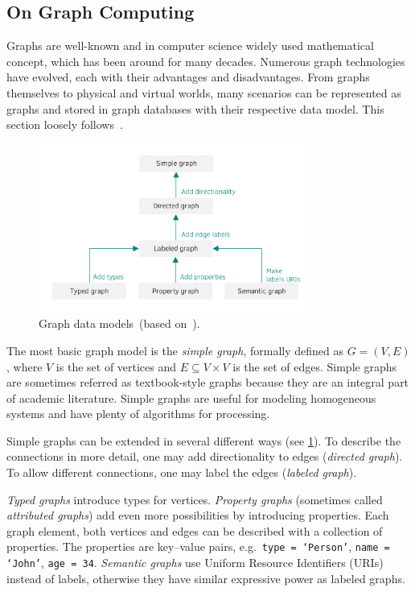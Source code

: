 \subsection{On Graph Computing}
Graphs are well-known and in computer science widely used mathematical concept, which has been around for many decades. Numerous graph technologies have evolved, each with their advantages and disadvantages. From graphs themselves to physical and virtual worlds, many scenarios can be represented as graphs and stored in graph databases with their respective data model. This section loosely follows~\cite{scm, On_Graph_Computing}.

\begin{figure}[!ht]
	\centering
	\includegraphics[width=0.8\textwidth]{include/figures/graph-classes}
	\caption{Graph data models~(based on~\cite{DBLP:journals/corr/abs-1006-2361}).}
	\label{fig:graph-classes}
\end{figure}

The most basic graph model is the \emph{simple graph}, formally defined as $G = (V, E)$, where $V$ is the set of vertices and $E \subseteq V \times V$ is the set of edges. Simple graphs are sometimes referred as textbook-style graphs because they are an integral part of academic literature. Simple graphs are useful for modeling homogeneous systems and have plenty of algorithms for processing.

Simple graphs can be extended in several different ways (see \cref{fig:graph-classes}). To describe the connections in more detail, one may add directionality to edges (\emph{directed graph}). To allow different connections, one may label the edges (\emph{labeled graph}).

\emph{Typed graphs} introduce types for vertices. \emph{Property graphs} (sometimes called \emph{attributed graphs}) add even more possibilities by introducing properties. Each graph element, both vertices and edges can be described with a collection of properties. The properties are key--value pairs, e.g.\ \texttt{type = `Person'}, \texttt{name = `John'}, \texttt{age = 34}. \emph{Semantic graphs} use Uniform Resource Identifiers (URIs) instead of labels, otherwise they have similar expressive power as labeled graphs.

